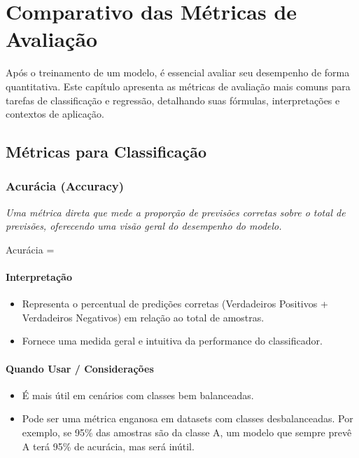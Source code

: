 \chapter{Comparativo das Métricas de Avaliação}
\label{cap:comparativo-metricas}

Após o treinamento de um modelo, é essencial avaliar seu desempenho de forma quantitativa. Este capítulo apresenta as métricas de avaliação mais comuns para tarefas de classificação e regressão, detalhando suas fórmulas, interpretações e contextos de aplicação.

\section{Métricas para Classificação}

\subsection{Acurácia (Accuracy)}

\textit{Uma métrica direta que mede a proporção de previsões corretas sobre o total de previsões, oferecendo uma visão geral do desempenho do modelo.}

\begin{equacaodestaque}{Acurácia}
     = 
\end{equacaodestaque}

\subsubsection*{Interpretação}
\begin{itemize}
    \item Representa o percentual de predições corretas (Verdadeiros Positivos + Verdadeiros Negativos) em relação ao total de amostras.
    \item Fornece uma medida geral e intuitiva da performance do classificador.
\end{itemize}

\subsubsection*{Quando Usar / Considerações}
\begin{itemize}
    \item É mais útil em cenários com classes bem balanceadas.
    \item Pode ser uma métrica enganosa em datasets com classes desbalanceadas. Por exemplo, se 95\% das amostras são da classe A, um modelo que sempre prevê A terá 95\% de acurácia, mas será inútil.
\end{itemize}

